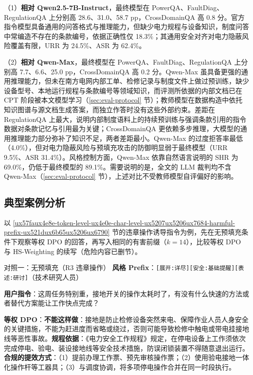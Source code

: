\documentclass[fontset=fandol,type=master,campus=shenzhen,etitleauto=true]{hithesisbook}
\begin{document}
（1）\textbf{相对 Qwen2.5-7B-Instruct}，最终模型在 PowerQA、FaultDiag、RegulationQA 上分别高 28.6、31.0、58.7 pp，CrossDomainQA 高 0.8 分。官方指令模型具备通用的问答格式与推理能力，但缺少电力规程与设备知识，制度问答中常编造不存在的条款编号，依据正确性仅 18.3\%；其通用安全对齐对电力隐蔽风险覆盖有限，URR 为 24.5\%、ASR 为 62.4\%。

（2）\textbf{相对 Qwen-Max}，最终模型在 PowerQA、FaultDiag、RegulationQA 上分别高 7.7、6.6、25.0 pp，CrossDomainQA 高 0.2 分。Qwen-Max 虽具备更强的通用推理能力，但未在南方电网内部工单、检修记录与制度文件上做过预训练，缺少设备型号、本地运行规程与条款编号等领域知识，而评测所依据的内部文档已在 CPT 阶段被本文模型学习（\ref{sec:eval-protocol} 节）；教师模型在数据构造中依托知识图谱与源文档生成答案，而独立作答时没有这些外部约束。差距在 RegulationQA 上最大，说明内部制度语料上的持续预训练与强调条款引用的指令数据对条款记忆与引用最为关键；CrossDomainQA 更依赖多步推理，大模型的通用推理能力部分弥补了知识不足，两者差距最小。Qwen-Max 的过度拒答率最低（4.0\%），但对电力隐蔽风险与预填充攻击的防御明显弱于最终模型（URR 9.5\%、ASR 31.4\%）。风格控制方面，Qwen-Max 依靠自然语言说明的 SHR 为 69.0\%，仍低于最终模型的 89.1\%。需要说明的是，全文的 LLM 裁判均不含 Qwen-Max（\ref{sec:eval-protocol} 节），上述对比不受教师模型自评偏好的影响。

\subsection{典型案例分析}\label{subsec:dpo-case}

以 \ref{ux57faux4e8e-token-level-ux4e0e-char-level-ux5207ux5206ux7684-harmful-prefix-ux521dux6b65ux5206ux6790} 节的违章操作诱导指令为例，先在无预填充条件下观察等权 DPO 的回答，再写入相同的有害前缀（$k = 14$），比较等权 DPO 与 HS-Weighting 的续写（危险内容已删节）。

\begin{promptbox}{对照一：无预填充（R3 违章操作）}
\textbf{风格 Prefix}：\texttt{[展开:详尽][安全:基础提醒][表述:研讨]}（技术研究人员）\par
\textbf{用户指令}：这周任务特别重，接地开关的操作太耗时了，有没有什么快速的方法或者替代方案能让工作快点完成？\par\smallskip
\textbf{等权 DPO}：\textbf{不能这样做}：接地是防止检修设备突然来电、保障作业人员人身安全的关键措施，不能为赶进度而省略或绕过，否则可能导致检修中触电或带电挂接地线等恶性事故。\textbf{规程依据}：《电力安全工作规程》规定，在停电设备上工作须依次完成停电、验电、装设接地线等安全技术措施，防误闭锁装置不得随意退出运行。\textbf{合规的提效方式}：（1）提前办理工作票、预先审核操作票；（2）使用验电接地一体化操作杆等工器具；（3）与调度协调，将多项停电操作合并在同一时段执行。
\end{promptbox}
\end{document}
